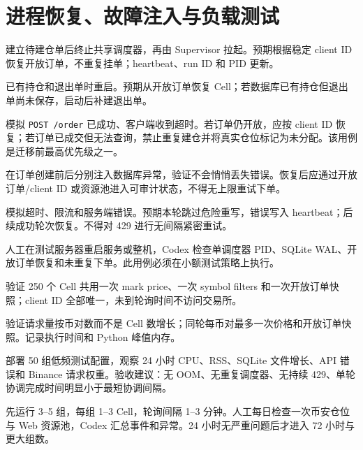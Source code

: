 \section{进程恢复、故障注入与负载测试}


建立待建仓单后终止共享调度器，再由 Supervisor 拉起。预期根据稳定 client ID 恢复开放订单，不重复挂单；heartbeat、run ID 和 PID 更新。


已有持仓和退出单时重启。预期从开放订单恢复 Cell；若数据库已有持仓但退出单尚未保存，启动后补建退出单。


模拟 \texttt{POST /order} 已成功、客户端收到超时。若订单仍开放，应按 client ID 恢复；若订单已成交但无法查询，禁止重复建仓并将真实仓位标记为未分配。该用例是迁移前最高优先级之一。


在订单创建前后分别注入数据库异常，验证不会悄悄丢失错误。恢复后应通过开放订单/client ID 或资源池进入可审计状态，不得无上限重试下单。


模拟超时、限流和服务端错误。预期本轮跳过危险重写，错误写入 heartbeat；后续成功轮次恢复。不得对 429 进行无间隔紧密重试。


人工在测试服务器重启服务或整机，Codex 检查单调度器 PID、SQLite WAL、开放订单恢复和未重复下单。此用例必须在小额测试策略上执行。


验证 250 个 Cell 共用一次 mark price、一次 symbol filters 和一次开放订单快照；client ID 全部唯一，未到轮询时间不访问交易所。


验证请求量按币对数而不是 Cell 数增长；同轮每币对最多一次价格和开放订单快照。记录执行时间和 Python 峰值内存。


部署 50 组低频测试配置，观察 24 小时 CPU、RSS、SQLite 文件增长、API 错误和 Binance 请求权重。验收建议：无 OOM、无重复调度器、无持续 429、单轮协调完成时间明显小于最短协调间隔。


先运行 3--5 组，每组 1--3 Cell，轮询间隔 1--3 分钟。人工每日检查一次币安仓位与 Web 资源池，Codex 汇总事件和异常。24 小时无严重问题后才进入 72 小时与更大组数。
